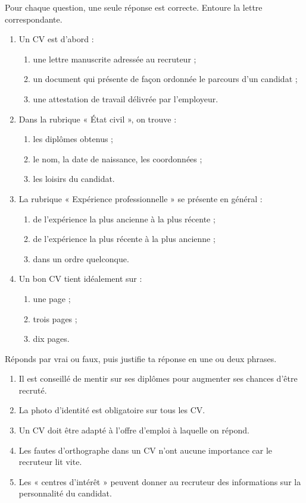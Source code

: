 \documentclass[11pt]{article}
\begin{document}
\begin{exercice}
Pour chaque question, une seule réponse est correcte. Entoure la lettre correspondante.
\begin{enumerate}
\item Un CV est d'abord :
\begin{enumerate}
\item une lettre manuscrite adressée au recruteur ;
\item un document qui présente de façon ordonnée le parcours d'un candidat ;
\item une attestation de travail délivrée par l'employeur.
\end{enumerate}
\item Dans la rubrique « État civil », on trouve :
\begin{enumerate}
\item les diplômes obtenus ;
\item le nom, la date de naissance, les coordonnées ;
\item les loisirs du candidat.
\end{enumerate}
\item La rubrique « Expérience professionnelle » se présente en général :
\begin{enumerate}
\item de l'expérience la plus ancienne à la plus récente ;
\item de l'expérience la plus récente à la plus ancienne ;
\item dans un ordre quelconque.
\end{enumerate}
\item Un bon CV tient idéalement sur :
\begin{enumerate}
\item une page ;
\item trois pages ;
\item dix pages.
\end{enumerate}
\end{enumerate}
\end{exercice}

\begin{exercice}
Réponds par vrai ou faux, puis justifie ta réponse en une ou deux phrases.
\begin{enumerate}
\item Il est conseillé de mentir sur ses diplômes pour augmenter ses chances d'être recruté.
\item La photo d'identité est obligatoire sur tous les CV.
\item Un CV doit être adapté à l'offre d'emploi à laquelle on répond.
\item Les fautes d'orthographe dans un CV n'ont aucune importance car le recruteur lit vite.
\item Les « centres d'intérêt » peuvent donner au recruteur des informations sur la personnalité du candidat.
\end{enumerate}
\end{exercice}
\end{document}
